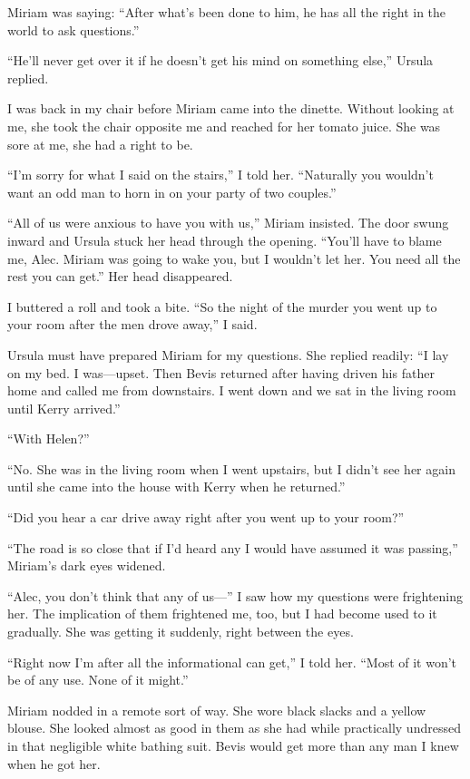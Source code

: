 \documentclass{novel}
\begin{document}
Miriam was saying: “After what’s been done to him, he has all the right in the world to ask questions.”

“He’ll never get over it if he doesn’t get his mind on something else,” Ursula replied.

I was back in my chair before Miriam came into the dinette. Without looking at me, she took the chair opposite me and reached for her tomato juice. She was sore at me, she had a right to be.

“I’m sorry for what I said on the stairs,” I told her. “Naturally you wouldn’t want an odd man to horn in on your party of two couples.”

“All of us were anxious to have you with us,” Miriam insisted. The door swung inward and Ursula stuck her head through the opening. “You’ll have to blame me, Alec. Miriam was going to wake you, but I wouldn’t let her. You need all the rest you can get.” Her head disappeared.

I buttered a roll and took a bite. “So the night of the murder you went up to your room after the men drove away,” I said.

Ursula must have prepared Miriam for my questions. She replied readily: “I lay on my bed. I was—upset. Then Bevis returned after having driven his father home and called me from downstairs. I went down and we sat in the living room until Kerry arrived.”

“With Helen?”

“No. She was in the living room when I went upstairs, but I didn’t see her again until she came into the house with Kerry when he returned.”

“Did you hear a car drive away right after you went up to your room?”

“The road is so close that if I’d heard any I would have assumed it was passing,” Miriam’s dark eyes widened.

“Alec, you don’t think that any of us—” I saw how my questions were frightening her. The implication of them frightened me, too, but I had become used to it gradually. She was getting it suddenly, right between the eyes.

“Right now I’m after all the informational can get,” I told her. “Most of it won’t be of any use. None of it might.”

Miriam nodded in a remote sort of way. She wore black slacks and a yellow blouse. She looked almost as good in them as she had while practically undressed in that negligible white bathing suit. Bevis would get more than any man I knew when he got her.
\end{document}
